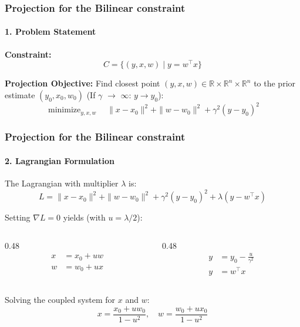 \documentclass[t, xcolor=table, aspectratio=169]{beamer}
\DeclareMathOperator*{\minimize}{minimize}
\begin{document}
    \begin{frame}
        \frametitle{Projection for the Bilinear constraint \cite{elser2019learning}}
        \framesubtitle{1. Problem Statement}
        \textbf{Constraint:}
        \begin{equation*}
            C = \{ (y, x, w) \mid y = w^\top x \}
        \end{equation*}
        
        \textbf{Projection Objective:}
        Find closest point $(y, x, w) \in \mathbb{R} \times \mathbb{R}^{n} \times \mathbb{R}^{n}$ to the prior estimate $(y_0, x_0, w_0)$ (If $\gamma$ $\to$ $\infty$: $y \to y_0$):\\
        \begin{equation*}
             \minimize_{y, x, w} \quad \|x - x_0\|^2 + \|w - w_0\|^2 + \gamma^2(y - y_0)^2 
        \end{equation*}
        \vspace{0.5em}
    \end{frame}

    \begin{frame}
        \frametitle{Projection for the Bilinear constraint \cite{elser2019learning}}
        \framesubtitle{2. Lagrangian Formulation}
        The Lagrangian with multiplier $\lambda$ is:
        \begin{equation*}
            L = \|x - x_0\|^2 + \|w - w_0\|^2 + \gamma^2(y - y_0)^2 + \lambda( y - w^\top x)
        \end{equation*}
        
        Setting $\nabla L = 0$ yields (with $u = \lambda/2$):
        \begin{columns}[onlytextwidth,T]
            \begin{column}{0.48\textwidth}
                \begin{align*}
                    x &= x_0 + u w \\
                    w &= w_0 + u x
                \end{align*}
            \end{column}
            \begin{column}{0.48\textwidth}
                \begin{align*}
                    y &= y_0 - \frac{ u}{\gamma^2}\\
                    y &= w^\top x
                \end{align*}
            \end{column}
        \end{columns}
        \vspace{1em}
        Solving the coupled system for $x$ and $w$:
        \begin{equation*}
             x = \frac{x_0 + u w_0}{1 - u^2}, \quad w = \frac{w_0 + u x_0}{1 - u^2}
        \end{equation*}
    \end{frame}
\end{document}
